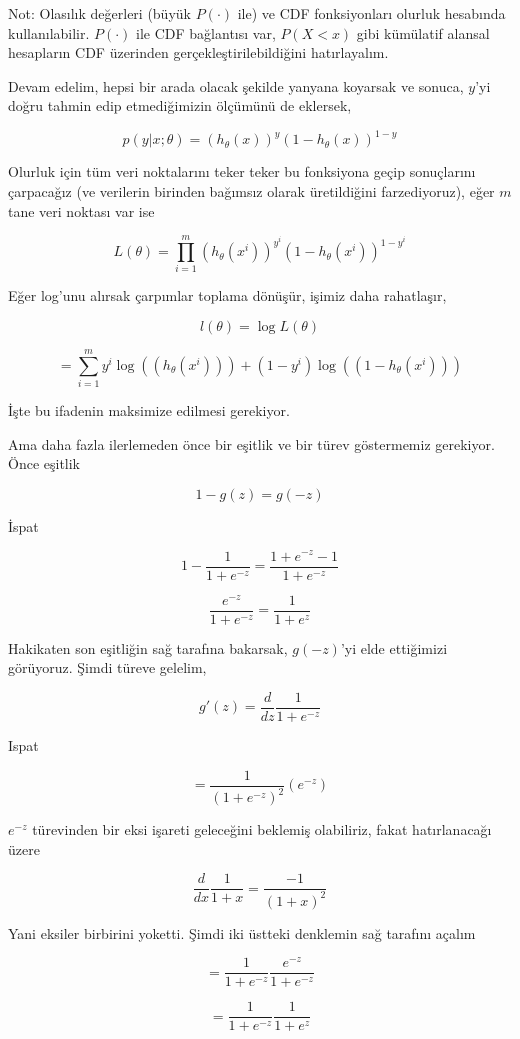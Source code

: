 \documentclass[12pt,fleqn]{article}\usepackage{../../common}
\begin{document}
Not: Olasılık değerleri (büyük $P(\cdot)$ ile) ve CDF fonksiyonları olurluk
hesabında kullanılabilir. $P(\cdot)$ ile CDF bağlantısı var, $P(X<x)$ gibi
kümülatif alansal hesapların CDF üzerinden gerçekleştirilebildiğini
hatırlayalım.

Devam edelim, hepsi bir arada olacak şekilde yanyana koyarsak ve sonuca, $y$'yi
doğru tahmin edip etmediğimizin ölçümünü de eklersek,

$$p(y | x;\theta) = (h_\theta(x))^y (1-h_\theta(x))^{1-y}$$

Olurluk için tüm veri noktalarını teker teker bu fonksiyona geçip sonuçlarını
çarpacağız (ve verilerin birinden bağımsız olarak üretildiğini farzediyoruz),
eğer $m$ tane veri noktası var ise

$$ L(\theta) = \prod_{i=1}^{m} (h_\theta(x^i))^{y^i}
(1-h_\theta(x^i))^{1-{y^i}}$$

Eğer log'unu alırsak çarpımlar toplama dönüşür, işimiz daha rahatlaşır,

$$ l(\theta) = \log L(\theta) $$

$$ = \sum_{i=1}^{m}
     y^i \log( (h_\theta(x^i)) ) +
     (1-{y^i}) \log( (1-h_\theta(x^i)) )
$$

İşte bu ifadenin maksimize edilmesi gerekiyor.

Ama daha fazla ilerlemeden önce bir eşitlik ve bir türev göstermemiz
gerekiyor.  Önce eşitlik

$$ 1-g(z) = g(-z) $$

İspat

$$ 1-\frac{1}{1+e^{-z}}  = \frac{1+e^{-z}-1}{1+e^{-z}}$$

$$ \frac{e^{-z}}{1+e^{-z}} = \frac{1}{1+e^{z}}$$

Hakikaten son eşitliğin sağ tarafına bakarsak, $g(-z)$'yi elde ettiğimizi
görüyoruz. Şimdi türeve gelelim,

$$
g'(z) = \frac{d}{dz} \frac{ 1}{1+ e^{ -z}} 
$$

Ispat

$$
= \frac{1}{(1+ e^{-z})^2} (e^{-z}) 
$$

$e^{ -z}$ türevinden bir eksi işareti geleceğini beklemiş olabiliriz, fakat
hatırlanacağı üzere

$$\frac{d}{dx} \frac{ 1}{1+x}  = \frac{-1}{(1+x)^2}$$

Yani eksiler birbirini yoketti. Şimdi iki üstteki denklemin sağ tarafını açalım

$$
 = \frac{1}{1+e^{-z}} \frac{e^{-z}}{1+e^{-z}}
$$

$$
 = \frac{1}{1+e^{-z}} \frac{1}{1+e^{z}}
 $$
\end{document}
